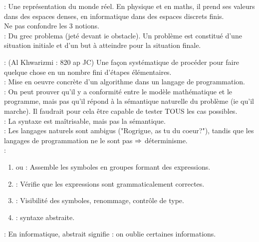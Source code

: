 : Une représentation du monde réel. En physique et en maths, il prend ses valeurs dans des espaces denses, en informatique dans des espaces discrets finis.\\

 Ne pas confondre les 3 notions.\\

 : Du grec problema (jeté devant ie obstacle). Un problème est constitué d'une situation initiale et d'un but à atteindre pour la situation finale.

 : (Al Khwarizmi : 820 ap JC) Une façon systématique de procéder pour faire quelque chose en un nombre fini d'étapes élémentaires.\\

 : Mise en oeuvre concrète d'un algorithme dans un langage de programmation.\\
   
 : On peut prouver qu'il y a conformité entre le modèle mathématique et le programme, mais pas qu'il répond à la sémantique naturelle du problème (ie qu'il marche). Il faudrait pour cela être capable de tester TOUS les cas possibles.\\

 : La syntaxe est maîtrisable, mais pas la sémantique.\\

 : Les langages naturels sont ambigus ("Rogrigue, as tu du coeur?"), tandis que les langages de programmation ne le sont pas $\Rightarrow$ déterminisme.\\

 : \begin{enumerate}
	\item {} ou  : Assemble les symboles en groupes formant des expressions. 
	\item {} : Vérifie que les expressions sont grammaticalement correctes.
	\item {} : Visibilité des symboles, renommage, contrôle de type.
	\item {} : syntaxe abstraite.
\end{enumerate}

 : En informatique, abstrait signifie : on oublie certaines informations.  

